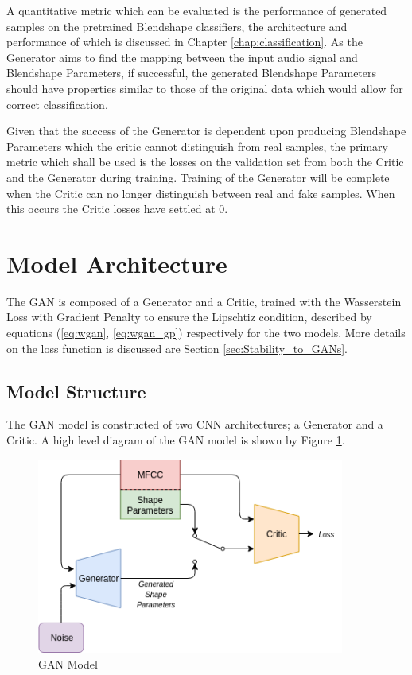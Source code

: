 A quantitative metric which can be evaluated is the performance of generated samples on the pretrained Blendshape classifiers, the architecture and performance of which is discussed in Chapter \ref{chap:classification}.
As the Generator aims to find the mapping between the input audio signal and Blendshape Parameters, if successful, the generated Blendshape Parameters should have properties similar to those of the original data which would allow for correct classification.

Given that the success of the Generator is dependent upon producing Blendshape Parameters which the critic cannot distinguish from real samples, the primary metric which shall be used is the losses on the validation set from both the Critic and the Generator during training.
Training of the Generator will be complete when the Critic can no longer distinguish between real and fake samples.
When this occurs the Critic losses have settled at 0.

\section{Model Architecture}
The GAN is composed of a Generator and a Critic, trained with the Wasserstein Loss with Gradient Penalty to ensure the Lipschtiz condition, described by equations (\ref{eq:wgan}, \ref{eq:wgan_gp}) respectively for the two models.
More details on the loss function is discussed are Section \ref{sec:Stability_to_GANs}.

\subsection{Model Structure}
The GAN model is constructed of two CNN architectures; a Generator and a Critic.
A high level diagram of the GAN model is shown by Figure \ref{fig:gan_model}.

\begin{figure}[h!]
    \centering
        \includegraphics[width=0.9\textwidth]{figures/gan/gan.png}
    \caption{GAN Model}\label{fig:gan_model}
\end{figure} 

